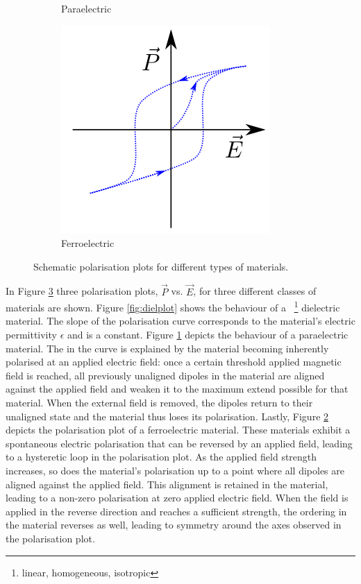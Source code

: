 \begin{figure}
\begin{subfigure}{0.3\textwidth}
	\caption{Paraelectric}
	\label{fig:parelplot}
\end{subfigure}
\begin{subfigure}{0.3\textwidth}
\centering
	\includegraphics[width=0.9\linewidth]{./figs/chap1/ferelpolplot}
	\caption{Ferroelectric}
	\label{fig:ferelplot}
\end{subfigure}
\caption{Schematic polarisation plots for different types of materials.}
\label{fig:polplot}
\end{figure}
In Figure \ref{fig:polplot} three polarisation plots, $\vec{P}$ vs. $\vec{E}$, for three different classes of materials are shown. Figure \ref{fig:dielplot} shows the behaviour of a ~\footnote{\ie{} linear, homogeneous, isotropic} dielectric material. The slope of the polarisation curve corresponds to the material's electric permittivity $\epsilon$ and is a constant. Figure \ref{fig:parelplot} depicts the behaviour of a paraelectric material. The  in the curve is explained by the material becoming inherently polarised at an applied electric field: once a certain threshold applied magnetic field is reached, all previously unaligned dipoles in the material are aligned against the applied field and weaken it to the maximum extend possible for that material. When the external field is removed, the dipoles return to their unaligned state and the material thus loses its polarisation. Lastly, Figure \ref{fig:ferelplot} depicts the polarisation plot of a ferroelectric material. These materials exhibit a spontaneous electric polarisation that can be reversed by an applied field, leading to a hysteretic loop in the polarisation plot. As the applied field strength increases, so does the material's polarisation up to a point where all dipoles are aligned against the applied field. This alignment is retained in the material, leading to a non-zero polarisation at zero applied electric field. When the field is applied in the reverse direction and reaches a sufficient strength, the ordering in the material reverses as well, leading to symmetry around the axes observed in the polarisation plot.\\
